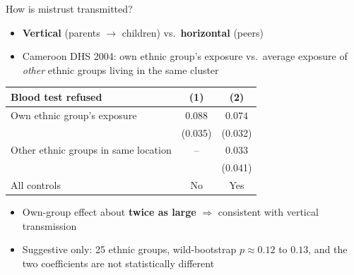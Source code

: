 \documentclass[aspectratio=1610]{beamer}
\newcommand{\backupbutton}[2]{\hyperlink{#1}{\beamergotobutton{#2}}}
\begin{document}
\begin{frame}[label=main-transmission]{How is mistrust transmitted?}
  \begin{itemize}
    \item \textbf{Vertical} (parents $\to$ children) vs.\ \textbf{horizontal} (peers)
      \citep[in the spirit of][]{nunn_wantchekon_2011}
    \item Cameroon DHS 2004: own ethnic group's exposure vs.\ average exposure of
      \emph{other} ethnic groups living in the same cluster
  \end{itemize}
  \centering
  \small
  \begin{tabular}{lcc}
    \toprule
    Blood test refused & (1) & (2) \\
    \midrule
    Own ethnic group's exposure          & $0.088$ & $0.074$ \\
                                         & (0.035) & (0.032) \\
    Other ethnic groups in same location & --      & $0.033$ \\
                                         &         & (0.041) \\
    \midrule
    All controls & No & Yes \\
    \bottomrule
  \end{tabular}

  \vspace{0.4em}
  \raggedright
  \begin{itemize}
    \item Own-group effect about \textbf{twice as large} $\Rightarrow$ consistent with vertical transmission
    \item Suggestive only: 25 ethnic groups, wild-bootstrap $p \approx 0.12$ to $0.13$, and the two
      coefficients are not statistically different \backupbutton{bk-transmission}{Full table}
  \end{itemize}
\end{frame}
\end{document}
